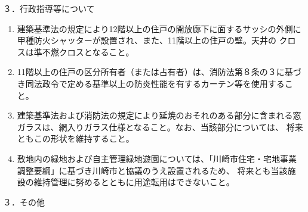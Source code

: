 \documentclass[12pt,uplatex,dvipdfmx]{jsarticle}
\begin{document}
３．行政指導等について
\begin{enumerate}
\item 建築基準法の規定により12階以上の住戸の開放廊下に面するサッシの外側に甲種防火シャッターが設置され、また、11階以上の住戸の壁。天井の クロスは準不燃クロスとなること。
\item 11階以上の住戸の区分所有者（または占有者）は、消防法第８条の３に基づき同法政令で定める基準以上の防炎性能を有するカーテン等を使用すること。
\item 建築基準法および消防法の規定により延焼のおそれのある部分に含まれる窓ガラスは、網入りガラス仕様となること。なお、当該部分については、
      将来ともこの形状を維持すること。
\item 敷地内の緑地および自主管理緑地遊園については、「川崎市住宅・宅地事業調整要綱」に基づき川崎市と協議のうえ設置されるため、
      将来とも当該施設の維持管理に努めるとともに用途転用はできないこと。
\end{enumerate}
３．その他
\end{document}

